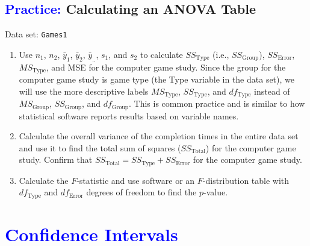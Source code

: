 \documentclass[
]{report}
\begin{document}
\hypertarget{calculating-an-anova-table}{%
\subsection*{\texorpdfstring{\textcolor{blue}{Practice:} Calculating an ANOVA Table}{ Calculating an ANOVA Table}}\label{calculating-an-anova-table}}

\vspace{-1em}

Data set: \texttt{Games1}

\begin{enumerate}
\def\labelenumi{\arabic{enumi}.}
\setcounter{enumi}{36}
\item
  Use \(\scriptstyle n_1\), \(\scriptstyle n_2\), \(\scriptstyle \bar{y}_1\), \(\scriptstyle \bar{y}_2\), \(\scriptstyle \bar{y}_{..}\), \(\scriptstyle s_1\), and \(\scriptstyle s_2\) to calculate \(\scriptstyle SS_{\text{Type}}\) (i.e., \(\scriptstyle SS_{\text{Group}}\)), \(\scriptstyle SS_{\text{Error}}\), \(\scriptstyle MS_{\text{Type}}\), and MSE for the computer game study. Since the group for the computer game study is game type (the Type variable in the data set), we will use the more descriptive labels \(\scriptstyle MS_{\text{Type}}\), \(\scriptstyle SS_{\text{Type}}\), and \(\scriptstyle df_{\text{Type}}\) instead of \(\scriptstyle MS_{\text{Group}}\), \(\scriptstyle SS_{\text{Group}}\), and \(\scriptstyle df_{\text{Group}}\). This is common practice and is similar to how statistical software reports results based on variable names.
\item
  Calculate the overall variance of the completion times in the entire data set and use it to find the total sum of squares (\(\scriptstyle SS_{\text{Total}}\)) for the computer game study. Confirm that \(\scriptstyle SS_{\text{Total}} = SS_{\text{Type}} + SS_{\text{Error}}\) for the computer game study.
\item
  Calculate the \(\scriptstyle F\)-statistic and use software or an \(\scriptstyle F\)-distribution table with \(\scriptstyle df_{\text{Type}}\) and \(\scriptstyle df_{\text{Error}}\) degrees of freedom to find the \(\scriptstyle p\)-value.
\end{enumerate}

\hypertarget{section-24}{%
\section{\texorpdfstring{\textcolor{blue}{ Confidence Intervals}}{}}\label{section-24}}
\end{document}
